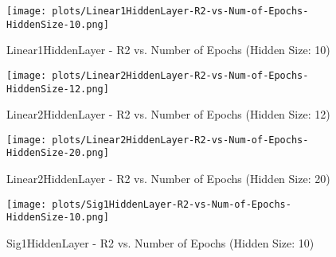 
\begin{figure}[H]
    \centering
    \texttt{[image: plots/Linear1HiddenLayer-R2-vs-Num-of-Epochs-HiddenSize-10.png]}
    \caption{Linear1HiddenLayer - R2 vs. Number of Epochs (Hidden Size: 10)}
\end{figure}

\begin{figure}[H]
    \centering
    \texttt{[image: plots/Linear2HiddenLayer-R2-vs-Num-of-Epochs-HiddenSize-12.png]}
    \caption{Linear2HiddenLayer - R2 vs. Number of Epochs (Hidden Size: 12)}
\end{figure}

\begin{figure}[H]
    \centering
    \texttt{[image: plots/Linear2HiddenLayer-R2-vs-Num-of-Epochs-HiddenSize-20.png]}
    \caption{Linear2HiddenLayer - R2 vs. Number of Epochs (Hidden Size: 20)}
\end{figure}

\begin{figure}[H]
    \centering
    \texttt{[image: plots/Sig1HiddenLayer-R2-vs-Num-of-Epochs-HiddenSize-10.png]}
    \caption{Sig1HiddenLayer - R2 vs. Number of Epochs (Hidden Size: 10)}
\end{figure}

